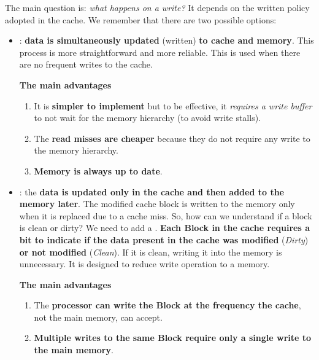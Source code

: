 \noindent
The main question is: \emph{what happens on a write?} It depends on the written policy adopted in the cache. We remember that there are two possible options:
\begin{itemize}
    \item {}: \textbf{data is simultaneously updated} (written) \textbf{to cache and memory}. This process is more straightforward and more reliable. This is used when there are no frequent writes to the cache.
    
    \textcolor{Green3}{ \textbf{The main advantages}}
    \begin{enumerate}
        \item It is \textbf{simpler to implement} but to be effective, it \emph{requires a write buffer} to not wait for the memory hierarchy (to avoid write stalls).

        \item The \textbf{read misses are cheaper} because they do not require any write to the memory hierarchy.

        \item \textbf{Memory is always up to date}. 
    \end{enumerate}


    \item {}: the \textbf{data is updated only in the cache and then added to the memory later}. The modified cache block is written to the memory only when it is replaced due to a cache miss. So, how can we understand if a block is clean or dirty? We need to add a . \textbf{Each Block in the cache requires a bit to indicate if the data present in the cache was modified} (\emph{Dirty}) \textbf{or not modified} (\emph{Clean}). If it is clean, writing it into the memory is unnecessary. It is designed to reduce write operation to a memory.

    \textcolor{Green3}{ \textbf{The main advantages}}
    \begin{enumerate}
        \item The \textbf{processor can write the Block at the frequency the cache}, not the main memory, can accept.

        \item \textbf{Multiple writes to the same Block require only a single write to the main memory}.
    \end{enumerate}
\end{itemize}

